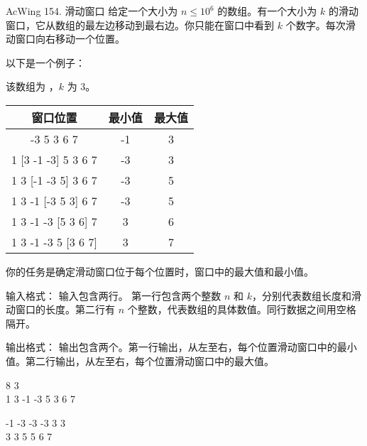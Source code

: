 \begin{titledbox}{AcWing 154. 滑动窗口}
    给定一个大小为 $n \le 10^6$ 的数组。有一个大小为 $k$ 的滑动窗口，它从数组的最左边移动到最右边。你只能在窗口中看到 $k$ 个数字。每次滑动窗口向右移动一个位置。

    以下是一个例子：

    该数组为 \inlinecode{[1 3 -1 -3 5 3 6 7]}，$k$ 为 $3$。

    \begin{tabular}{|c|c|c|}
        \hline
        窗口位置               & 最小值 & 最大值 \\ \hline
        [1 3  -1] -3 5 3 6 7 & -1  & 3   \\ \hline
        1 [3  -1  -3] 5 3 6 7  & -3  & 3   \\ \hline
        1 3 [-1  -3 5] 3 6 7 & -3  & 5   \\ \hline
        1 3  -1 [-3 5 3] 6 7 & -3  & 5   \\ \hline
        1 3  -1  -3 [5 3 6] 7  & 3   & 6   \\ \hline
        1 3  -1  -3 5 [3 6 7]  & 3   & 7   \\ \hline
    \end{tabular}

    你的任务是确定滑动窗口位于每个位置时，窗口中的最大值和最小值。

    输入格式：
    输入包含两行。 第一行包含两个整数 $n$ 和 $k$，分别代表数组长度和滑动窗口的长度。第二行有 $n$ 个整数，代表数组的具体数值。同行数据之间用空格隔开。

    输出格式：
    输出包含两个。第一行输出，从左至右，每个位置滑动窗口中的最小值。第二行输出，从左至右，每个位置滑动窗口中的最大值。

    \begin{inputblock}
        8 3 \\
        1 3 -1 -3 5 3 6 7
    \end{inputblock}
    \begin{outputblock}
        -1 -3 -3 -3 3 3 \\
        3 3 5 5 6 7
    \end{outputblock}

\end{titledbox}


